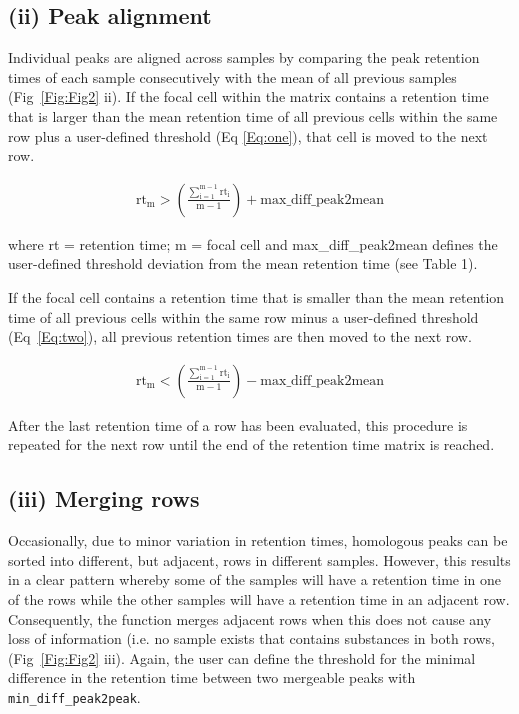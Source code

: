 \documentclass[10pt,letterpaper]{article}
\begin{document}
\subsection*{(ii) Peak alignment}
Individual peaks are aligned across samples by comparing the peak retention times of each sample consecutively with the mean of all previous samples (Fig~\ref{Fig:Fig2} ii). If the focal cell within the matrix contains a retention time that is larger than the mean retention time of all previous cells within the same row plus a user-defined threshold (Eq \eqref{Eq:one}), that cell is moved to the next row.

\begin{eqnarray}
\label{Eq:one}
\mathrm{rt_m} > \left(\frac{\mathrm{\sum_{i=1}^{m-1}rt_{i}}}{\mathrm{m}-1}\right) + \mathrm{max\_diff\_peak2mean}
\end{eqnarray}

where rt = retention time; m = focal cell and max\_diff\_peak2mean defines the user-defined threshold deviation from the mean retention time (see Table 1).

If the focal cell contains a retention time that is smaller than the mean retention time of all previous cells within the same row minus a user-defined threshold (Eq~\eqref{Eq:two}), all previous retention times are then moved to the next row.

\begin{eqnarray}
\label{Eq:two}
\mathrm{rt_m} < \left(\frac{\mathrm{\sum_{i=1}^{m-1}rt_{i}}}{\mathrm{m}-1}\right) - \mathrm{max\_diff\_peak2mean}
\end{eqnarray}

After the last retention time of a row has been evaluated, this procedure is repeated for the next row until the end of the retention time matrix is reached.

\subsection*{(iii)  Merging rows}
Occasionally, due to minor variation in retention times, homologous peaks can be sorted into different, but adjacent, rows in different samples. However, this results in a clear pattern whereby some of the samples will have a retention time in one of the rows while the other samples will have a retention time in an adjacent row. Consequently, the function merges adjacent rows when this does not cause any loss of information (i.e. no sample exists that contains substances in both rows, (Fig~\ref{Fig:Fig2} iii). Again, the user can define the threshold for the minimal difference in the retention time between two mergeable peaks with \texttt{min\_diff\_peak2peak}. \par 
\end{document}
